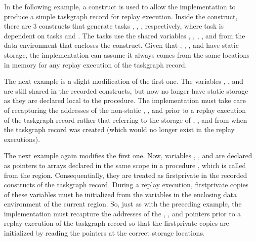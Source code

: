 In the following example, a  construct is used to allow the
implementation to produce a simple taskgraph record for replay execution.
Inside the construct, there are 3  constructs that generate tasks
, , , respectively, where task  is dependent on
tasks  and . The tasks use the shared variables ,
, , , and  from the data environment
that encloses the  construct. Given that , ,
, and  have static storage, the implementation can assume
it always comes from the same locations in memory for any replay execution of
the taskgraph record.



The next example is a slight modification of the first one. The variables
, , and  are still shared in the recorded
 constructs, but now no longer have static storage as they are
declared local to the  procedure. The implementation
must take care of recapturing the addresses of the non-static ,
, and  prior to a replay execution of the taskgraph record
rather that referring to the storage of , , and 
from when the taskgraph record was created (which would no longer exist in the
replay executions).



The next example again modifies the first one. Now, variables ,
, and  are declared as pointers to arrays declared in the
same scope in a procedure , which is called from the
 region. Consequentially, they are treated as firstprivate in
the recorded  constructs of the taskgraph record. During a replay
execution, firstprivate copies of these variables must be initialized from the
variables in the enclosing data environment of the current 
region. So, just as with the preceding example, the implementation must
recapture the addresses of the , , and  pointers
prior to a replay execution of the taskgraph record so that the firstprivate
copies are initialized by reading the pointers at the correct storage locations.


